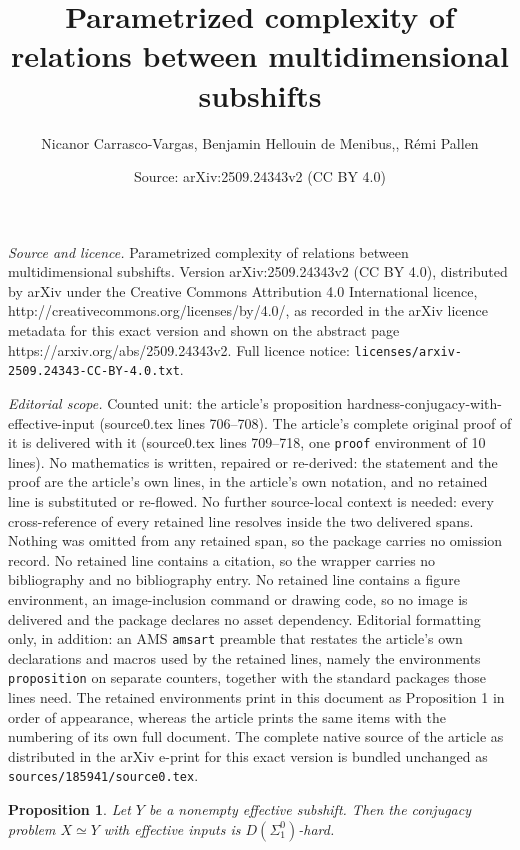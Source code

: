 \documentclass[10pt,a4paper]{amsart}
\title{Parametrized complexity of relations between multidimensional subshifts}
\author{Nicanor Carrasco-Vargas, Benjamin Hellouin de Menibus,, R\'emi Pallen}
\date{Source: arXiv:2509.24343v2 (CC BY 4.0)}
\newtheorem{proposition}{Proposition}
\begin{document}
\maketitle

\noindent\emph{Source and licence.} Parametrized complexity of relations between multidimensional subshifts. Version arXiv:2509.24343v2 (CC BY 4.0), distributed by arXiv under the Creative Commons Attribution 4.0 International licence, http://creativecommons.org/licenses/by/4.0/, as recorded in the arXiv licence metadata for this exact version and shown on the abstract page https://arxiv.org/abs/2509.24343v2. Full licence notice: \texttt{licenses/arxiv-2509.24343-CC-BY-4.0.txt}.\par\smallskip

\noindent\textit{Editorial scope.} Counted unit: the article's proposition hardness-conjugacy-with-effective-input (source0.tex lines 706--708). The article's complete original proof of it is delivered with it (source0.tex lines 709--718, one \texttt{proof} environment of 10 lines). No mathematics is written, repaired or re-derived: the statement and the proof are the article's own lines, in the article's own notation, and no retained line is substituted or re-flowed.  No further source-local context is needed: every cross-reference of every retained line resolves inside the two delivered spans.  Nothing was omitted from any retained span, so the package carries no omission record.  No retained line contains a citation, so the wrapper carries no bibliography and no bibliography entry.  No retained line contains a figure environment, an image-inclusion command or drawing code, so no image is delivered and the package declares no asset dependency.  Editorial formatting only, in addition: an AMS \texttt{amsart} preamble that restates the article's own declarations and macros used by the retained lines, namely the environments \texttt{proposition} on separate counters, together with the standard packages those lines need.  The retained environments print in this document as Proposition 1 in order of appearance, whereas the article prints the same items with the numbering of its own full document.  The complete native source of the article as distributed in the arXiv e-print for this exact version is bundled unchanged as \texttt{sources/185941/source0.tex}.
\begin{proposition}\label{hardness-conjugacy-with-effective-input}
    Let $Y$ be a nonempty effective subshift. Then the conjugacy problem $X\simeq Y$ with effective inputs is $D(\Sigma_1^0)$-hard. 
\end{proposition}
\end{document}
